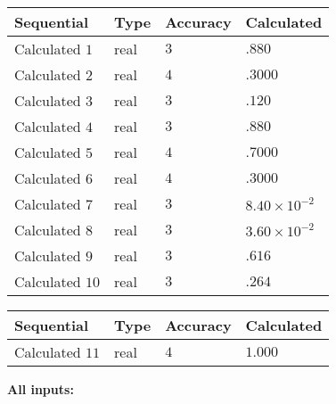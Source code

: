 \documentclass[12pt]{article}
\begin{document}
  
\noindent\begin{tabular}{|l|l|l|l|}
\hline
 Sequential & Type & Accuracy & Calculated \\ 
\hline
 
 
  Calculated $           1$ & real & $           3 $ & 
 $ .880 $ 
 \\  \hline  
 
 
  Calculated $           2$ & real & $           4 $ & 
 $ .3000 $ 
 \\  \hline  
 
 
  Calculated $           3$ & real & $           3 $ & 
 $ .120 $ 
 \\  \hline  
 
 
  Calculated $           4$ & real & $           3 $ & 
 $ .880 $ 
 \\  \hline  
 
 
  Calculated $           5$ & real & $           4 $ & 
 $ .7000 $ 
 \\  \hline  
 
 
  Calculated $           6$ & real & $           4 $ & 
 $ .3000 $ 
 \\  \hline  
 
 
  Calculated $           7$ & real & $           3 $ & 
 $ 8.40 \times 10^{-2} $ 
 \\  \hline  
 
 
  Calculated $           8$ & real & $           3 $ & 
 $ 3.60 \times 10^{-2} $ 
 \\  \hline  
 
 
  Calculated $           9$ & real & $           3 $ & 
 $ .616 $ 
 \\  \hline  
 
 
  Calculated $          10$ & real & $           3 $ & 
 $ .264 $ 
 \\  \hline  
 \end{tabular}
   
   
  
  
\noindent\begin{tabular}{|l|l|l|l|}
\hline
 Sequential & Type & Accuracy & Calculated \\ 
\hline
 
 
  Calculated $          11$ & real & $           4 $ & 
 $ 1.000 $ 
 \\  \hline  
 \end{tabular}
   
   
   
   
\noindent\vspace{0.1in}\hspace{-0.08in} {\textbf{\Large{All inputs: }}}
   
\end{document}
